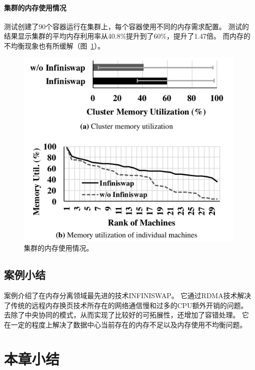 \paragraph{集群的内存使用情况}
测试创建了90个容器运行在集群上，每个容器使用不同的内存需求配置。
测试的结果显示集群的平均内存利用率从40.8\%提升到了60\%，提升了1.47倍。
而内存的不均衡现象也有所缓解（图~\ref{fig:infiniswap_evaluation2}）。

\begin{figure}
\centering
\includegraphics[scale=0.3]{Figures/memory/infiniswap_evaluation2.png}
\decoRule
\caption{集群的内存使用情况\cite{gu2017efficient}。}
\label{fig:infiniswap_evaluation2}
\end{figure}

\subsection{案例小结}
案例介绍了在内存分离领域最先进的技术INFINISWAP。
它通过RDMA技术解决了传统的远程内存换页技术所存在的网络通信慢和过多的CPU额外开销的问题。
去除了中央协同的模式，从而实现了比较好的可拓展性，还增加了容错处理。
它在一定的程度上解决了数据中心当前存在的内存不足以及内存使用不均衡问题。


\section{本章小结}

